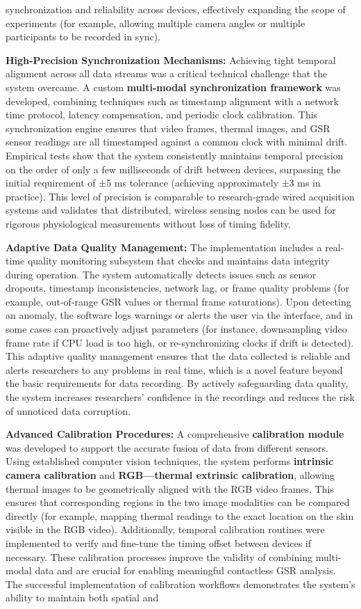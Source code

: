 synchronization and reliability across devices, effectively expanding the scope of experiments (for example, allowing multiple camera angles or multiple participants to be recorded in sync). \item \textbf{High-Precision Synchronization Mechanisms:} Achieving tight temporal alignment across all data streams was a critical technical challenge that the system overcame. A custom \textbf{multi-modal synchronization framework} was developed, combining techniques such as timestamp alignment with a network time protocol, latency compensation, and periodic clock calibration. This synchronization engine ensures that video frames, thermal images, and GSR sensor readings are all timestamped against a common clock with minimal drift. Empirical tests show that the system consistently maintains temporal precision on the order of only a few milliseconds of drift between devices, surpassing the initial requirement of ±5 ms tolerance (achieving approximately ±3 ms in practice). This level of precision is comparable to research-grade wired acquisition systems and validates that distributed, wireless sensing nodes can be used for rigorous physiological measurements without loss of timing fidelity. \item \textbf{Adaptive Data Quality Management:} The implementation includes a real-time quality monitoring subsystem that checks and maintains data integrity during operation. The system automatically detects issues such as sensor dropouts, timestamp inconsistencies, network lag, or frame quality problems (for example, out-of-range GSR values or thermal frame saturations). Upon detecting an anomaly, the software logs warnings or alerts the user via the interface, and in some cases can proactively adjust parameters (for instance, downsampling video frame rate if CPU load is too high, or re-synchronizing clocks if drift is detected). This adaptive quality management ensures that the data collected is reliable and alerts researchers to any problems in real time, which is a novel feature beyond the basic requirements for data recording. By actively safeguarding data quality, the system increases researchers' confidence in the recordings and reduces the risk of unnoticed data corruption. \item \textbf{Advanced Calibration Procedures:} A comprehensive \textbf{calibration module} was developed to support the accurate fusion of data from different sensors. Using established computer vision techniques, the system performs \textbf{intrinsic camera calibration} and \textbf{RGB---thermal extrinsic calibration}, allowing thermal images to be geometrically aligned with the RGB video frames. This ensures that corresponding regions in the two image modalities can be compared directly (for example, mapping thermal readings to the exact location on the skin visible in the RGB video). Additionally, temporal calibration routines were implemented to verify and fine-tune the timing offset between devices if necessary. These calibration processes improve the validity of combining multi-modal data and are crucial for enabling meaningful contactless GSR analysis. The successful implementation of calibration workflows demonstrates the system's ability to maintain both spatial and 